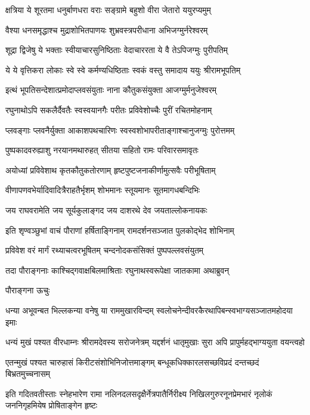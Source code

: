 \twolineshloka
{क्षत्रिया ये शूरतमा धनुर्बाणधरा वराः}
{सङ्ग्रामे बहुशो वीरा जेतारो ययुरप्यमुम्}%

\twolineshloka
{वैश्या धनसमृद्धाश्च मुद्राशोभितपाणयः}
{शुभ्रवस्त्रपरीधाना अभिजग्मुर्नरेश्वरम्}%

\twolineshloka
{शूद्रा द्विजेषु ये भक्ताः स्वीयाचारसुनिष्ठिताः}
{वेदाचाररता ये वै तेऽपिजग्मुः पुरीपतिम्}%

\twolineshloka
{ये ये वृत्तिकरा लोकाः स्वे स्वे कर्मण्यधिष्ठिताः}
{स्वकं वस्तु समादाय ययुः श्रीरामभूपतिम्}%

\twolineshloka
{इत्थं भूपतिसन्देशात्प्रमोदाप्लवसंयुताः}
{नाना कौतुकसंयुक्ता आजग्मुर्मनुजेश्वरम्}%


\twolineshloka
{रघुनाथोऽपि सकलैर्दैवतैः स्वस्वयानगैः}
{परीतः प्रविवेशोच्चैः पुरीं रचितमोहनाम्}%

\twolineshloka
{प्लवङ्गाः प्लवनैर्युक्ता आकाशपथचारिणः}
{स्वस्वशोभापरीताङ्गाश्चानुजग्मुः पुरोत्तमम्}%

\twolineshloka
{पुष्पकादवरुह्याशु नरयानमथारुहत्}
{सीतया सहितो रामः परिवारसमावृतः}%

\twolineshloka
{अयोध्यां प्रविवेशाथ कृतकौतुकतोरणाम्}
{हृष्टपुष्टजनाकीर्णामुत्सवैः परीभूषिताम्}%

\twolineshloka
{वीणापणवभेर्यादिवादित्रैराहतैर्भृशम्}
{शोभमानः स्तूयमानः सूतमागधबन्दिभिः}%

\twolineshloka
{जय राघवरामेति जय सूर्यकुलाङ्गद}
{जय दाशरथे देव जयताल्लोकनायकः}%

\twolineshloka
{इति शृण्वञ्छुभां वाचं पौराणां हर्षिताङ्गिनाम्}
{रामदर्शनसञ्जात पुलकोद्भेद शोभिनाम्}%

\twolineshloka
{प्रविवेश वरं मार्गं रथ्याचत्वरभूषितम्}
{चन्दनोदकसंसिक्तं पुष्पपल्लवसंयुतम्}%

\twolineshloka
{तदा पौराङ्गनाः काश्चिद्गवाक्षबिलमाश्रिताः}
{रघुनाथस्वरूपेक्षा जातकामा अथाब्रुवन्}%

पौराङ्गना ऊचुः

\twolineshloka
{धन्या अभूवन्बत भिल्लकन्या वनेषु या राममुखारविन्दम्}
{स्वलोचनेन्दीवरकैरथापिबन्स्वभाग्यसञ्जातमहोदया इमाः}%

\twolineshloka
{धन्यं मुखं पश्यत वीरधाम्नः श्रीरामदेवस्य सरोजनेत्रम्}
{यद्दर्शनं धातृमुखाः सुरा अपि प्रापुर्महद्भाग्ययुता वयन्त्वहो}%

\twolineshloka
{एतन्मुखं पश्यत चारुहासं किरीटसंशोभिनिजोत्तमाङ्गम्}
{बन्धूकधिक्कारलसच्छविप्रदं दन्तच्छदं बिभ्रतमुच्चनासम्}%

\twolineshloka
{इति गदितवतीस्ताः स्नेहभारेण रामा नलिनदलसदृक्षैर्नेत्रपातैर्निरीक्ष्य}
{निखिलगुरुरनूनप्रेमभारं नृलोकं जननिगृहमियेष प्रोषिताङ्गेन हृष्टः}%

